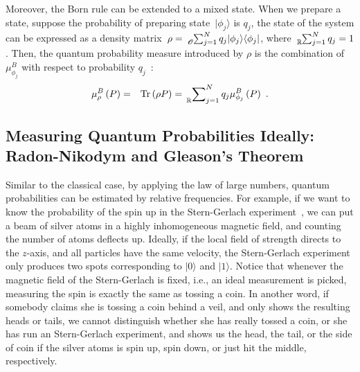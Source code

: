 \documentclass{article}
\theoremstyle{remark}
\newcommand{\ket}[1]{|#1\rangle}
\newcommand{\proj}[1]{|#1 \rangle\langle #1 |}
\newcommand{\Tr}{\mathop{\mathrm{Tr}}\nolimits}
\begin{document}
Moreover, the Born rule can be extended to a mixed state. When we
prepare a state, suppose the probability of preparing state~$\ket{\phi_{j}}$
is $q_{j}$, the state of the system can be expressed as a density
matrix~$\rho=\tensor*[_{\mathscr{O}}]{\sum}{_{j=1}^{N}}q_{j}\proj{\phi_{j}}$,
where $\tensor*[_{\mathbb{R}}]{\sum}{_{j=1}^{N}}q_{j}=1$. Then, the
quantum probability measure introduced by $\rho$ is the combination
of $\mu_{\phi_{j}}^{B}$ with respect to probability $q_{j}$~\cite{peres1995quantum,544199,RiederSvozil2007}:
\begin{eqnarray}
\mu_{\rho}^{B}\left(P\right) & = & \Tr\left(\rho P\right)=\sideset{_{\mathbb{R}}}{_{j=1}^{N}}\sum q_{j}\mu_{\phi_{j}}^{B}\left(P\right)\textrm{ .}\label{BornRule.mixed}
\end{eqnarray}



\subsection{Measuring Quantum Probabilities Ideally: Radon-Nikodym and Gleason's
Theorem}

Similar to the classical case, by applying the law of large numbers,
quantum probabilities can be estimated by relative frequencies. For
example, if we want to know the probability of the spin up in the
Stern-Gerlach experiment~\cite{Stern1988,peres1995quantum,544199,Griffiths2003},
we can put a beam of silver atoms in a highly inhomogeneous magnetic
field, and counting the number of atoms deflects up. Ideally, if the
local field of strength directs to the $z$-axis, and all particles
have the same velocity, the Stern-Gerlach experiment only produces
two spots corresponding to $\ket{0}$ and $\ket{1}$. Notice that
whenever the magnetic field of the Stern-Gerlach is fixed, i.e., an
ideal measurement is picked, measuring the spin is exactly the same
as tossing a coin. In another word, if somebody claims she is tossing
a coin behind a veil, and only shows the resulting heads or tails,
we cannot distinguish whether she has really tossed a coin, or she
has run an Stern-Gerlach experiment, and shows us the head, the tail,
or the side of coin if the silver atoms is spin up, spin down, or
just hit the middle, respectively.
\end{document}
